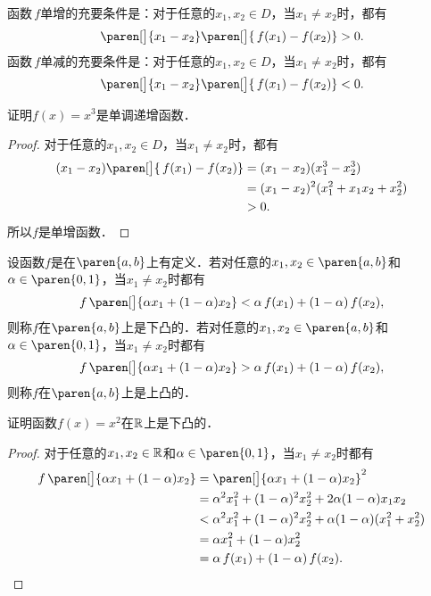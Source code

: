 \begin{theorem*}
  函数\(\,f\)单增的充要条件是：对于任意的\(x_1, x_2 \in D\)，当\(x_1 \ne x_2\)时，都有
  \begin{equation*}
    \paren[\big]{x_1 - x_2}\paren[\big]{\,f(x_1) - f(x_2)} > 0.
  \end{equation*}
  函数\(\,f\)单减的充要条件是：对于任意的\(x_1, x_2 \in D\)，当\(x_1 \ne x_2\)时，都有
  \begin{equation*}
    \paren[\big]{x_1 - x_2}\paren[\big]{\,f(x_1) - f(x_2)} < 0.
  \end{equation*}
\end{theorem*}

\begin{example*}
  证明\(f(x) = x^3\)是单调递增函数．

  \begin{proof}
    对于任意的\(x_1, x_2 \in D\)，当\(x_1 \ne x_2\)时，都有
    \[
      \begin{split}
        (x_1 - x_2) \paren[\big]{\,f(x_1) - f(x_2)}
        &= (x_1 - x_2) (x_1^3 - x_2^3) \\
        &= (x_1 - x_2)^2 (x_1^2 + x_1 x_2 + x_2^2) \\
        &> 0.
      \end{split}
    \]
    所以\(f\)是单增函数．
  \end{proof}
\end{example*}

\begin{definition*}
  设函数\(f\)是在\(\paren{a,b}\)上有定义．若对任意的\(x_1, x_2 \in \paren{a,b}\)和\(\alpha \in \paren{0,1}\)，当\(x_1 \ne x_2\)时都有
  \[
    f\,\paren[\big]{\alpha x_1 + (1-\alpha) x_2} < \alpha\,f(x_1) + (1-\alpha)\,f(x_2),
  \]
  则称\(f\)在\(\paren{a,b}\)上是下凸的．若对任意的\(x_1, x_2 \in \paren{a,b}\)和\(\alpha \in \paren{0,1}\)，当\(x_1 \ne x_2\)时都有
  \[
    f\,\paren[\big]{\alpha x_1 + (1-\alpha) x_2} > \alpha\,f(x_1) + (1-\alpha)\,f(x_2),
  \]
  则称\(f\)在\(\paren{a,b}\)上是上凸的．
\end{definition*}

\begin{example*}
  证明函数\(f(x) = x^2\)在\(\mathbb{R}\)上是下凸的．

  \begin{proof}
    对于任意的\(x_1, x_2 \in \mathbb{R}\)和\(\alpha \in \paren{0,1}\)，当\(x_1 \ne x_2\)时都有
    \[
      \begin{split}
        f\,\paren[\big]{\alpha x_1 + (1-\alpha) x_2}
        &= \paren[\big]{\alpha x_1 + (1-\alpha) x_2}^2 \\
        &= \alpha^2 x_1^2 + (1-\alpha)^2 x_2^2 + 2 \alpha (1-\alpha) x_1 x_2 \\
        &< \alpha^2 x_1^2 + (1-\alpha)^2 x_2^2 + \alpha (1-\alpha) (x_1^2 + x_2^2) \\
        &= \alpha x_1^2 + (1-\alpha) x_2^2 \\
        &= \alpha\,f(x_1) + (1-\alpha)\,f(x_2). \qedhere
      \end{split}
    \]
  \end{proof}
\end{example*}

